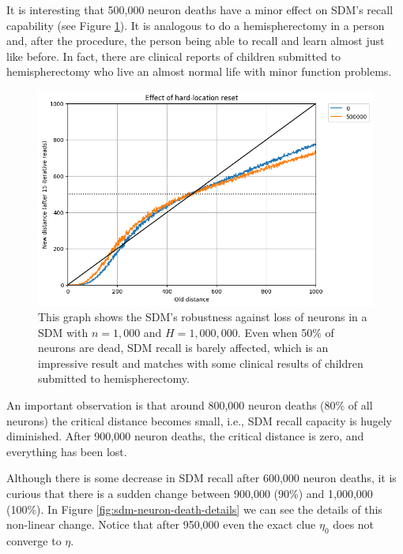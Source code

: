 It is interesting that 500,000 neuron deaths have a minor effect on SDM's recall capability (see Figure \ref{fig:sdm-neuron-death-500k}). It is analogous to do a hemispherectomy in a person and, after the procedure, the person being able to recall and learn almost just like before. In fact, there are clinical reports of children submitted to hemispherectomy who live an almost normal life with minor function problems.

\begin{figure}[!p]
\centering\includegraphics[width=\textwidth]{./images02/new-images/sdm-neuron-death-500k.png}
\caption{This graph shows the SDM's robustness against loss of neurons in a SDM with $n=1,000$ and $H=1,000,000$. Even when 50\% of neurons are dead, SDM recall is barely affected, which is an impressive result and matches with some clinical results of children submitted to hemispherectomy.
\label{fig:sdm-neuron-death-500k}}
\end{figure}

An important observation is that around 800,000 neuron deaths (80\% of all neurons) the critical distance becomes small, i.e., SDM recall capacity is hugely diminished. After 900,000 neuron deaths, the critical distance is zero, and everything has been lost.

Although there is some decrease in SDM recall after 600,000 neuron deaths, it is curious that there is a sudden change between 900,000 (90\%) and 1,000,000 (100\%). In Figure \ref{fig:sdm-neuron-death-details} we can see the details of this non-linear change. Notice that after 950,000 even the exact clue $\eta_0$ does not converge to $\eta$.

